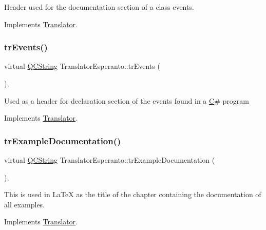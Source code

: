 Header used for the documentation section of a class\textquotesingle{} events. 

Implements \mbox{\hyperlink{class_translator}{Translator}}.

\mbox{\label{class_translator_esperanto_a88572a98550e5ae9a575d5d6dd987a10}} 
\subsubsection{\texorpdfstring{trEvents()}{trEvents()}}
{\footnotesize\ttfamily virtual \mbox{\hyperlink{class_q_c_string}{Q\+C\+String}} Translator\+Esperanto\+::tr\+Events (\begin{DoxyParamCaption}{ }\end{DoxyParamCaption})\hspace{0.3cm}{\ttfamily [inline]}, {\ttfamily [virtual]}}

Used as a header for declaration section of the events found in a \mbox{\hyperlink{class_c}{C}}\# program 

Implements \mbox{\hyperlink{class_translator}{Translator}}.

\mbox{\label{class_translator_esperanto_a7dce1c7d8ff2e4d85a78af267910e2a2}} 
\subsubsection{\texorpdfstring{trExampleDocumentation()}{trExampleDocumentation()}}
{\footnotesize\ttfamily virtual \mbox{\hyperlink{class_q_c_string}{Q\+C\+String}} Translator\+Esperanto\+::tr\+Example\+Documentation (\begin{DoxyParamCaption}{ }\end{DoxyParamCaption})\hspace{0.3cm}{\ttfamily [inline]}, {\ttfamily [virtual]}}

This is used in La\+TeX as the title of the chapter containing the documentation of all examples. 

Implements \mbox{\hyperlink{class_translator}{Translator}}.

